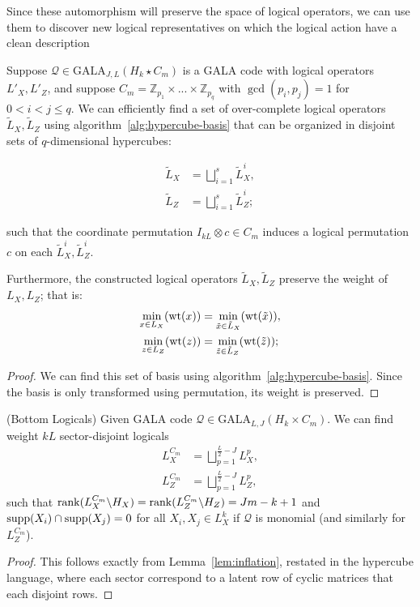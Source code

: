 Since these automorphism will preserve the space of logical operators, we can use them to discover new logical representatives on which the logical action have a clean description

\begin{proposition}\label{prop:hypercube-logical}
    Suppose $\mathcal{Q}\in \mathrm{GALA}_{J,L}(H_k\star C_m)$ is a GALA code with logical operators $L'_X, L'_Z$, and suppose $C_m = \mathbb Z_{p_1}\times ...\times\mathbb Z_{p_{q}}$ with $\gcd(p_i, p_j) = 1$ for $0<i< j\leq q$. We can efficiently find a set of over-complete logical operators $\tilde L_X, \tilde L_Z$ using algorithm~\ref{alg:hypercube-basis} that can be organized in disjoint sets of $q$-dimensional hypercubes:

    \begin{align}
        \tilde L_X &= \bigsqcup_{i = 1}^s \tilde L_X^i, \\
        \tilde L_Z &= \bigsqcup_{i = 1}^s \tilde L_Z^i;
    \end{align}

    such that the coordinate permutation $I_{kL}\otimes c\in C_m$ induces a logical permutation $c$ on each $\tilde L^i_X, \tilde L^i_Z$. 

    Furthermore, the constructed logical operators $\tilde L_X, \tilde L_Z$ preserve the weight of $L_X, L_Z$; that is:
    \begin{align}
        \min_{x\in L_X}(\mathrm{wt}(x)) &= \min_{\tilde x\in \tilde L_X}(\mathrm{wt}(\tilde {x})),\\
        \min_{z\in L_Z}(\mathrm{wt}(z)) &= \min_{\tilde z\in \tilde L_Z}(\mathrm{wt}(\tilde{z}));
    \end{align}
\end{proposition}

\begin{proof}
    We can find this set of basis using algorithm~\ref{alg:hypercube-basis}. Since the basis is only transformed using permutation, its weight is preserved. 
\end{proof}


\begin{corollary}(Bottom Logicals)
Given GALA code $\mathcal{Q}\in \mathrm{GALA}_{L,J}(H_k\times C_m)$. We can find weight $kL$ sector-disjoint logicals
\begin{align}
    L_X^{C_m} &= \bigsqcup_{p = 1} ^{\frac{L}{2} - J} L^p_X, \\
    L_Z^{C_m} &= \bigsqcup_{p = 1} ^{\frac{L}{2} - J} L^p_Z,
\end{align}
such that $\mathrm{rank}(L_X^{C_m}\backslash H_X) = \mathrm{rank}(L_Z^{C_m}\backslash H_Z) = Jm - k +1$ and $\mathrm{supp}(X_i) \cap \mathrm{supp}(X_j) = 0$ for all $X_i, X_j\in L^k_X$ if $\mathcal{Q}$ is monomial (and similarly for $L_Z^{C_m}$). 
\end{corollary}
\begin{proof}
    This follows exactly from Lemma~\ref{lem:inflation}, restated in the hypercube language, where each sector correspond to a latent row of cyclic matrices that each disjoint rows.
\end{proof}
